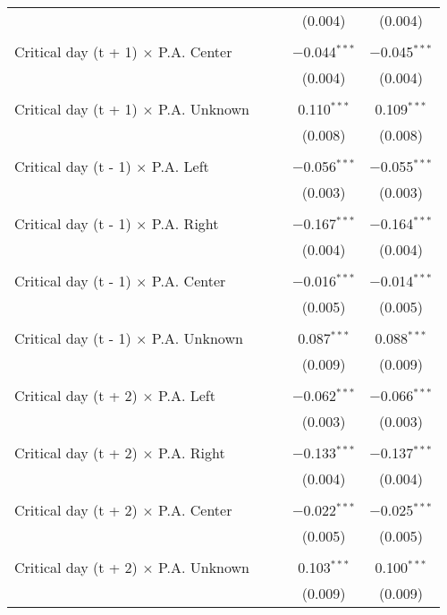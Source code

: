 \documentclass[
]{article}
\begin{document}
\begin{table}[!htbp]
{\begin{tabular}{@{\extracolsep{5pt}}lcccc}
  &  &  & (0.004) & (0.004) \\ 
  & & & & \\ 
 Critical day (t + 1) $\times$ P.A. Center &  &  & $-$0.044$^{***}$ & $-$0.045$^{***}$ \\ 
  &  &  & (0.004) & (0.004) \\ 
  & & & & \\ 
 Critical day (t + 1) $\times$ P.A. Unknown &  &  & 0.110$^{***}$ & 0.109$^{***}$ \\ 
  &  &  & (0.008) & (0.008) \\ 
  & & & & \\ 
 Critical day (t - 1) $\times$ P.A. Left &  &  & $-$0.056$^{***}$ & $-$0.055$^{***}$ \\ 
  &  &  & (0.003) & (0.003) \\ 
  & & & & \\ 
 Critical day (t - 1) $\times$ P.A. Right &  &  & $-$0.167$^{***}$ & $-$0.164$^{***}$ \\ 
  &  &  & (0.004) & (0.004) \\ 
  & & & & \\ 
 Critical day (t - 1) $\times$ P.A. Center &  &  & $-$0.016$^{***}$ & $-$0.014$^{***}$ \\ 
  &  &  & (0.005) & (0.005) \\ 
  & & & & \\ 
 Critical day (t - 1) $\times$ P.A. Unknown &  &  & 0.087$^{***}$ & 0.088$^{***}$ \\ 
  &  &  & (0.009) & (0.009) \\ 
  & & & & \\ 
 Critical day (t + 2) $\times$ P.A. Left &  &  & $-$0.062$^{***}$ & $-$0.066$^{***}$ \\ 
  &  &  & (0.003) & (0.003) \\ 
  & & & & \\ 
 Critical day (t + 2) $\times$ P.A. Right &  &  & $-$0.133$^{***}$ & $-$0.137$^{***}$ \\ 
  &  &  & (0.004) & (0.004) \\ 
  & & & & \\ 
 Critical day (t + 2) $\times$ P.A. Center &  &  & $-$0.022$^{***}$ & $-$0.025$^{***}$ \\ 
  &  &  & (0.005) & (0.005) \\ 
  & & & & \\ 
 Critical day (t + 2) $\times$ P.A. Unknown &  &  & 0.103$^{***}$ & 0.100$^{***}$ \\ 
  &  &  & (0.009) & (0.009) \\ 

\end{tabular}}
\end{table}
\end{document}
